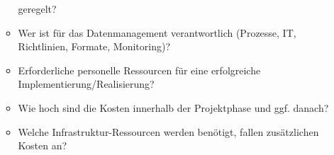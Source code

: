 \begin{enumerate}[start=0, label=\textbf{\arabic*})]
\begin{itemize}
                geregelt?
          \item Wer ist für das Datenmanagement verantwortlich (Prozesse, IT,
                Richtlinien, Formate, Monitoring)?
          \item Erforderliche personelle Ressourcen für eine erfolgreiche
                Implementierung/Realisierung?
          \item Wie hoch sind die Kosten innerhalb der Projektphase und ggf.
                danach?
          \item Welche Infrastruktur-Ressourcen werden benötigt, fallen
                zusätzlichen Kosten an?
        \end{itemize}
\end{enumerate}
